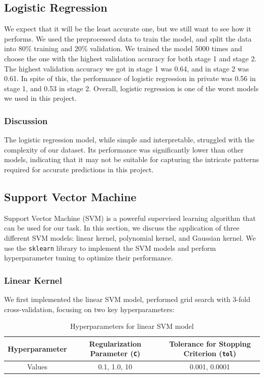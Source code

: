 \documentclass[11pt,a4paper]{article}
\begin{document}
\subsection{Logistic Regression}
We expect that it will be the least accurate one, but we still want to see how it performs.
We used the preprocessed data to train the model, and split the data into 80\% training and 20\% validation.
We trained the model 5000 times and choose the one with the highest validation accuracy for both stage 1 and stage 2.
The highest validation accuracy we got in stage 1 was 0.64, and in stage 2 was 0.61.
In spite of this, the performance of logistic regression in private was 0.56 in stage 1, and 0.53 in stage 2.
Overall, logistic regression is one of the worst models we used in this project.

\subsubsection{Discussion}

The logistic regression model, while simple and interpretable, struggled with the complexity of our dataset. Its performance was significantly lower than other models, indicating that it may not be suitable for capturing the intricate patterns required for accurate predictions in this project.

\subsection{Support Vector Machine}

Support Vector Machine (SVM) is a powerful supervised learning algorithm that can be used for our task. In this section, we discuss the application of three different SVM models: linear kernel, polynomial kernel, and Gaussian kernel. We use the \texttt{sklearn} library to implement the SVM models and perform hyperparameter tuning to optimize their performance.

\subsubsection{Linear Kernel}
We first implemented the linear SVM model, performed grid search with 3-fold cross-validation, focusing on two key hyperparameters:

\begin{table}[H]
  \centering
  \begin{tabular}{|c|c|c|}
  \hline
  Hyperparameter & Regularization Parameter (\texttt{C}) & Tolerance for Stopping Criterion (\texttt{tol}) \\ \hline
  Values & 0.1, 1.0, 10 & 0.001, 0.0001 \\ \hline
  \end{tabular}
  \caption{Hyperparameters for linear SVM model}
\end{table}
\end{document}
